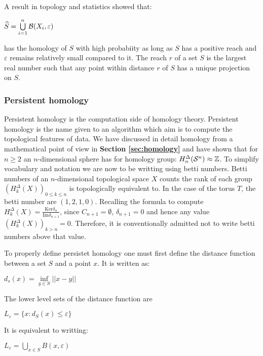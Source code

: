 \documentclass[12pt, a4paper]{article}
\begin{document}
A result in topology and statistics showed that:
\begin{center}
  $\widehat{S} = \bigcup\limits_{i=1}^{n}\mathcal{B}(X_i,\varepsilon)$
\end{center}

has the homology of $S$ with high probabiity as long as $S$ has a positive reach and $\varepsilon$ remains relatively small compared to it. The reach $r$ of a set $S$ is the largest real number such that any point within distance $r$ of $S$ has a unique projection on $S$.

\subsubsection{Persistent homology}

Persistent homology is the computation side of homology theory. Persistent homology is the name given to an algorithm which aim is to compute the topological features of data. We have discussed in detail homology from a mathematical point of view in \textbf{Section \ref{sec:homology}} and have shown that for $n \ge 2$ an $n$-dimensional sphere has for homology group: $H_n^\Delta(\mathcal{S}^n) \approx \mathbb{Z}$. To simplify vocabulary and notation we are now to be writting using betti numbers. Betti numbers of an $n$-dimensional topological space $X$ counts the rank of each group $(H_k^\Delta(X))_{0 \le k \le n}$ is topologically equivalent to. In the case of the torus $T$, the betti number are $(1,2,1,0)$. Recalling the formula to compute $H_k^\Delta(X) = \frac{\text{Ker} \delta_n}{\text{Im} \delta_{n+1}}$, since $C_{n+1} = \emptyset$, $\delta_{n+1} = 0$ and hence any value $(H_k^\Delta(X))_{k > n} = 0$. Therefore, it is conventionally admitted not to write betti numbers above that value. 

To properly define persistet homology one must first define the distance function between a set $S$ and a point $x$. It is written as:
\begin{center}
  $d_s(x) = \inf\limits_{y\in S} ||x-y||$  
\end{center}

The lower level sets of the distance function are

\begin{center}
  $L_\varepsilon = \lbrace x : d_S(x) \le \varepsilon \rbrace$
\end{center}

It is equivalent to writting:

\begin{center}
  $L_\varepsilon = \bigcup\limits_{x \in S} B(x,\varepsilon)$ 
\end{center}
\end{document}
